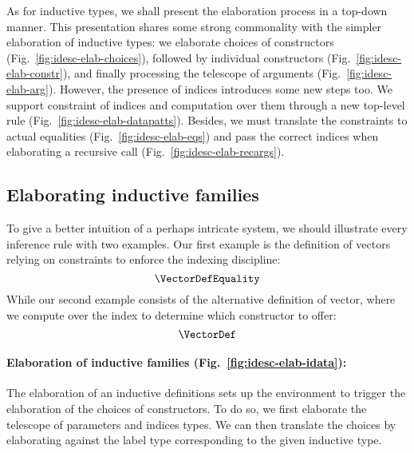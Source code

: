 \documentclass{scrartcl}
\theoremstyle{plain}
\theoremstyle{definition}
\begin{document}
As for inductive types, we shall present the elaboration process in a
top-down manner. This presentation shares some strong commonality with
the simpler elaboration of inductive types: we elaborate choices of
constructors (Fig.~\ref{fig:idesc-elab-choices}), followed by
individual constructors (Fig.~\ref{fig:idesc-elab-constr}), and
finally processing the telescope of arguments
(Fig.~\ref{fig:idesc-elab-arg}). However, the presence of indices
introduces some new steps too. We support constraint of indices and
computation over them through a new top-level rule
(Fig.~\ref{fig:idesc-elab-datapatts}). Besides, we must translate the
constraints to actual equalities (Fig.~\ref{fig:idesc-elab-eqs}) and
pass the correct indices when elaborating a recursive call
(Fig.~\ref{fig:idesc-elab-recargs}).



\subsection{Elaborating inductive families}



To give a better intuition of a perhaps intricate system, we should
illustrate every inference rule with two examples. Our first example
is the definition of vectors relying on constraints to enforce the
indexing discipline:
\[
\VectorDefEquality
\]
While our second example consists of the alternative definition of
vector, where we compute over the index to determine which constructor
to offer:
\[
\VectorDef
\]




\newcommand{\choicesVecEq}{\mathrm{choices}_{=}}
\newcommand{\codeVecEq}{\mathrm{code}_{=}}

\paragraph{Elaboration of inductive families (Fig.~\ref{fig:idesc-elab-idata}):} 
The elaboration of an inductive definitions sets up the environment to
trigger the elaboration of the choices of constructors. To do so, we
first elaborate the telescope of parameters and indices types. We can
then translate the choices by elaborating against the label type
corresponding to the given inductive type.
\end{document}
